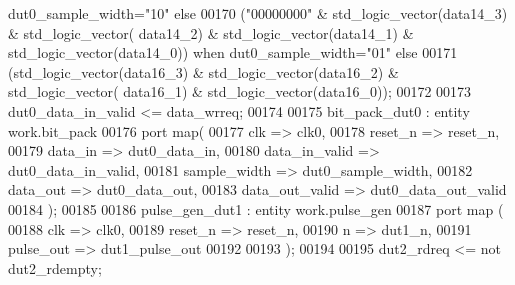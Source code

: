 \begin{DoxyCode}
{      dut0_sample_width}\textcolor{vhdlchar}{=}\textcolor{vhdllogic}{"10"} \textcolor{keywordflow}{else} 
00170                      \textcolor{vhdlchar}{(}\textcolor{vhdllogic}{"00000000"} \textcolor{vhdlchar}{&} \textcolor{comment}{std\_logic\_vector}\textcolor{vhdlchar}{(}\textcolor{vhdlchar}{data14_3}\textcolor{vhdlchar}{)} \textcolor{vhdlchar}{&} \textcolor{comment}{std\_logic\_vector}\textcolor{vhdlchar}{(}\textcolor{vhdlchar}{
      data14_2}\textcolor{vhdlchar}{)} \textcolor{vhdlchar}{&} \textcolor{comment}{std\_logic\_vector}\textcolor{vhdlchar}{(}\textcolor{vhdlchar}{data14_1}\textcolor{vhdlchar}{)} \textcolor{vhdlchar}{&} \textcolor{comment}{std\_logic\_vector}\textcolor{vhdlchar}{(}\textcolor{vhdlchar}{data14_0}\textcolor{vhdlchar}{)}\textcolor{vhdlchar}{)} \textcolor{keywordflow}{when} \textcolor{vhdlchar}{
      dut0_sample_width}\textcolor{vhdlchar}{=}\textcolor{vhdllogic}{"01"} \textcolor{keywordflow}{else} 
00171                      \textcolor{vhdlchar}{(}\textcolor{comment}{std\_logic\_vector}\textcolor{vhdlchar}{(}\textcolor{vhdlchar}{data16_3}\textcolor{vhdlchar}{)} \textcolor{vhdlchar}{&} \textcolor{comment}{std\_logic\_vector}\textcolor{vhdlchar}{(}\textcolor{vhdlchar}{data16_2}\textcolor{vhdlchar}{)} \textcolor{vhdlchar}{&} \textcolor{comment}{std\_logic\_vector}\textcolor{vhdlchar}{(}\textcolor{vhdlchar}{
      data16_1}\textcolor{vhdlchar}{)} \textcolor{vhdlchar}{&} \textcolor{comment}{std\_logic\_vector}\textcolor{vhdlchar}{(}\textcolor{vhdlchar}{data16_0}\textcolor{vhdlchar}{)}\textcolor{vhdlchar}{)}; 
00172   
00173   \textcolor{vhdlchar}{dut0_data_in_valid} \textcolor{vhdlchar}{<=} \textcolor{vhdlchar}{data_wrreq};
00174   
00175   bit\_pack\_dut0 : \textcolor{keywordflow}{entity} work.bit_pack 
00176 \textcolor{keywordflow}{port} \textcolor{keywordflow}{map}(
00177         clk             => clk0,
00178         reset_n         => reset_n,
00179         data_in         => dut0_data_in,
00180         data_in_valid   => dut0_data_in_valid,
00181         sample_width    => dut0_sample_width,
00182         data_out        => dut0_data_out,
00183         data_out_valid  => dut0_data_out_valid
00184 \textcolor{vhdlchar}{)};  
00185 
00186 pulse\_gen\_dut1 : \textcolor{keywordflow}{entity} work.pulse_gen
00187 \textcolor{keywordflow}{port} \textcolor{keywordflow}{map} (
00188          clk         => clk0,
00189          reset_n     => reset_n,
00190          n           => dut1_n, 
00191          pulse\_out   => dut1_pulse_out
00192                
00193 \textcolor{vhdlchar}{)};
00194 
00195 \textcolor{vhdlchar}{dut2_rdreq} \textcolor{vhdlchar}{<=} \textcolor{keywordflow}{not} \textcolor{vhdlchar}{dut2_rdempty};

\end{DoxyCode}
